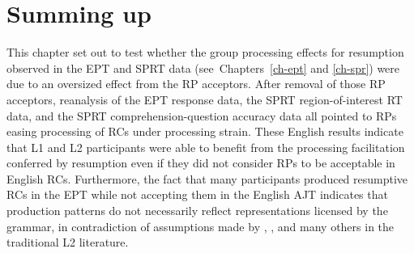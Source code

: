 \section{Summing up}\label{rnl-conclusion}

This chapter set out to test whether the group processing effects for resumption observed in the EPT and SPRT data (see~Chapters~\ref{ch-ept} and \ref{ch-spr}) were due to an oversized effect from the RP acceptors. After removal of those RP acceptors, reanalysis of the EPT response data, the SPRT region-of-interest RT data, and the SPRT comprehension-question accuracy data all pointed to RPs easing processing of RCs under processing strain. These English results indicate that L1 and L2 participants were able to benefit from the processing facilitation conferred by resumption even if they did not consider RPs to be acceptable in English RCs. Furthermore, the fact that many participants produced resumptive RCs in the EPT while not accepting them in the English AJT indicates that production patterns do not necessarily reflect representations licensed by the grammar, in contradiction of assumptions made by \textcite{hyltenstam1984,hyltenstam1990}, \textcite{eckman2004}, and many others in the traditional L2 literature.
